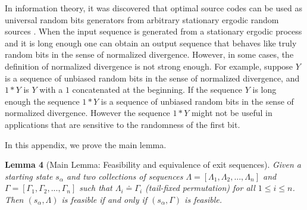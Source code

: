 \documentclass[journal]{IEEEtran}
\def\tmu{\doteq}
\begin{document}
In information theory, it was discovered that optimal source codes can be used as universal random bits generators from arbitrary stationary ergodic random sources \cite{Visweswariah98}\cite{Han05}. When the input sequence is generated from a stationary ergodic process and it is long enough one can obtain an output sequence that behaves like truly random bits in the sense of normalized divergence. However, in some cases, the definition of normalized divergence is not strong enough. For example, suppose $Y$ is a sequence of unbiased random bits in the sense of
normalized divergence, and $1*Y$ is $Y$ with a $1$ concatenated at the beginning. If the sequence $Y$ is long enough the sequence $1*Y$
is a sequence of unbiased random bits in the sense of normalized divergence. However the sequence $1*Y$ might not
be useful in applications that are sensitive to the randomness of the first bit.

\appendix
In this appendix, we prove the main lemma.

{\hspace{-0.3cm}\textbf{Lemma 4} (Main Lemma: Feasibility and equivalence of exit sequences).
\emph
{Given a starting state $s_\alpha$ and two collections of sequences $\Lambda=[\Lambda_1,\Lambda_2,...,\Lambda_n]$ and $\Gamma=[\Gamma_1,\Gamma_2,...,\Gamma_n]$
such that $\Lambda_i \tmu \Gamma_i$ (tail-fixed permutation) for all $1\leq i\leq n$. Then $(s_\alpha, \Lambda)$ is feasible if and only if $(s_\alpha, \Gamma)$ is feasible.}
}
\end{document}
